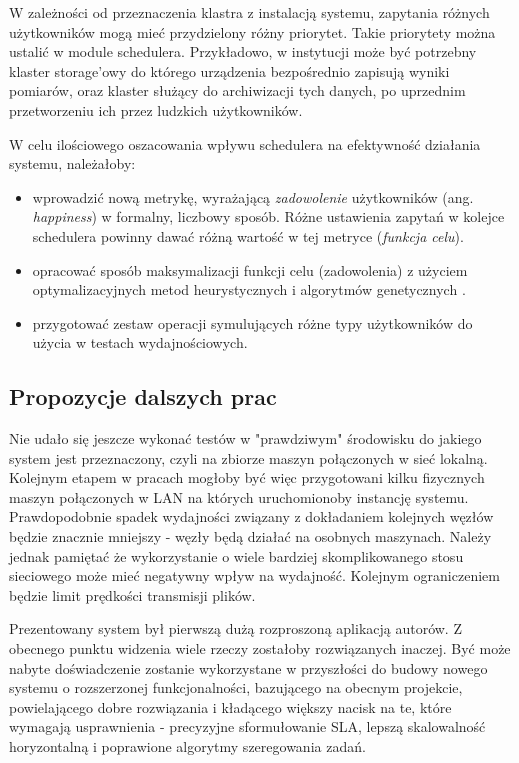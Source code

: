 W zależności od przeznaczenia klastra z instalacją systemu, zapytania różnych użytkowników mogą mieć przydzielony różny priorytet. Takie priorytety można ustalić w module schedulera. Przykładowo, w instytucji może być potrzebny klaster storage'owy do którego urządzenia bezpośrednio zapisują wyniki pomiarów, oraz klaster służący do archiwizacji tych danych, po uprzednim przetworzeniu ich przez ludzkich użytkowników.

W celu ilościowego oszacowania wpływu schedulera na efektywność działania systemu, należałoby:
\begin{itemize}
	\item wprowadzić nową metrykę, wyrażającą \textit{zadowolenie} użytkowników (ang. \textit{happiness}) w formalny, liczbowy sposób. Różne ustawienia zapytań w kolejce schedulera powinny dawać różną wartość w tej metryce (\textit{funkcja celu}).
	\item opracować sposób maksymalizacji funkcji celu (zadowolenia) z użyciem optymalizacyjnych metod heurystycznych i algorytmów genetycznych \cite{genetic-wiki}.
	\item przygotować zestaw operacji symulujących różne typy użytkowników do użycia w testach wydajnościowych.
\end{itemize}

\subsection{Propozycje dalszych prac}

Nie udało się jeszcze wykonać testów w "prawdziwym" środowisku do jakiego system jest przeznaczony, czyli na zbiorze maszyn połączonych w sieć lokalną. Kolejnym etapem w pracach mogłoby być więc przygotowani kilku fizycznych maszyn połączonych w LAN na których uruchomionoby instancję systemu. Prawdopodobnie spadek wydajności związany z dokładaniem kolejnych węzłów będzie znacznie mniejszy - węzły będą działać na osobnych maszynach. Należy jednak pamiętać że wykorzystanie o wiele bardziej skomplikowanego stosu sieciowego może mieć negatywny wpływ na wydajność. Kolejnym ograniczeniem będzie limit prędkości transmisji plików.

Prezentowany system był pierwszą dużą rozproszoną aplikacją autorów. Z obecnego punktu widzenia wiele rzeczy zostałoby rozwiązanych inaczej. Być może nabyte doświadczenie zostanie wykorzystane w przyszłości do budowy nowego systemu o rozszerzonej funkcjonalności, bazującego na obecnym projekcie, powielającego dobre rozwiązania i kładącego większy nacisk na te, które  wymagają usprawnienia - precyzyjne sformułowanie SLA, lepszą skalowalność horyzontalną i poprawione algorytmy szeregowania zadań.
